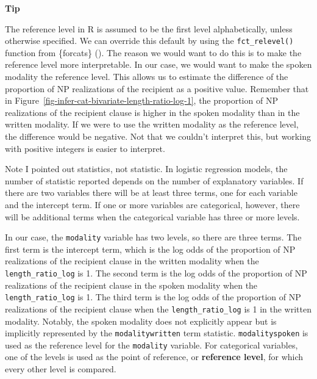 \documentclass[
  letterpaper,
  krantz1]{latex/krantz-mod}
\theoremstyle{definition}
\theoremstyle{definition}
\theoremstyle{remark}
\begin{document}
\begin{tcolorbox}[enhanced jigsaw, toprule=.15mm, breakable, colback=white, arc=.35mm, left=2mm, colframe=quarto-callout-color-frame, opacityback=0, bottomrule=.15mm, rightrule=.15mm, leftrule=.75mm]

\textbf{ Tip}

The reference level in R is assumed to be the first level
alphabetically, unless otherwise specified. We can override this default
by using the \texttt{fct\_relevel()} function from \{forcats\}
(). The reason we would want to
do this is to make the reference level more interpretable. In our case,
we would want to make the spoken modality the reference level. This
allows us to estimate the difference of the proportion of NP
realizations of the recipient as a positive value. Remember that in
Figure~\ref{fig-infer-cat-bivariate-length-ratio-log-1}, the proportion
of NP realizations of the recipient clause is higher in the spoken
modality than in the written modality. If we were to use the written
modality as the reference level, the difference would be negative. Not
that we couldn't interpret this, but working with positive integers is
easier to interpret.

\end{tcolorbox}

Note I pointed out statistics, not statistic. In logistic regression
models, the number of statistic reported depends on the number of
explanatory variables. If there are two variables there will be at least
three terms, one for each variable and the intercept term. If one or
more variables are categorical, however, there will be additional terms
when the categorical variable has three or more levels.

In our case, the \texttt{modality} variable has two levels, so there are
three terms. The first term is the intercept term, which is the log odds
of the proportion of NP realizations of the recipient clause in the
written modality when the \texttt{length\_ratio\_log} is 1. The second
term is the log odds of the proportion of NP realizations of the
recipient clause in the spoken modality when the
\texttt{length\_ratio\_log} is 1. The third term is the log odds of the
proportion of NP realizations of the recipient clause when the
\texttt{length\_ratio\_log} is 1 in the written modality. Notably, the
spoken modality does not explicitly appear but is implicitly represented
by the \texttt{modalitywritten} term statistic. \texttt{modalityspoken}
is used as the reference level for the \texttt{modality} variable. For
categorical variables, one of the levels is used as the point of
reference, or \textbf{reference level}, for which
every other level is compared.
\end{document}
